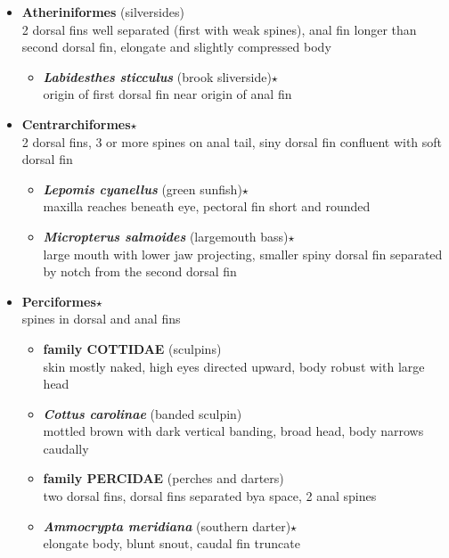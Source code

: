 \documentclass[a4paper,12pt]{article}
\begin{document}
\begin{description}
\begin{itemize}
\begin{itemize}
  \end{itemize}
  \item{\textbf{Atheriniformes} (silversides)} \\ 2 dorsal fins well separated (first with weak spines), anal fin longer than second dorsal fin, elongate and slightly compressed body
  \begin{itemize}
    \item{\textbf{\textit{   Labidesthes sticculus}} (brook sliverside)$\star$} \\ origin of first dorsal fin near origin of anal fin
  \end{itemize}
  \item{\textbf{Centrarchiformes}$\star$} \\ 2 dorsal fins, 3 or more spines on anal tail, siny dorsal fin confluent with soft dorsal fin
  \begin{itemize}
    \item{\textbf{\textit{   Lepomis cyanellus}} (green sunfish)$\star$} \\ maxilla reaches beneath eye, pectoral fin short and rounded
    \item{\textbf{\textit{   Micropterus salmoides}} (largemouth bass)$\star$} \\ large mouth with lower jaw projecting, smaller spiny dorsal fin separated by notch from the second dorsal fin
  \end{itemize}
  \item{\textbf{Perciformes}$\star$} \\ spines in dorsal and anal fins
  \begin{itemize}
    \item{\textbf{family COTTIDAE} (sculpins)} \\ skin mostly naked, high eyes directed upward, body robust with large head
    \item{\textbf{\textit{   Cottus carolinae}} (banded sculpin)} \\ mottled brown with dark vertical banding, broad head, body narrows caudally
    \item{\textbf{family PERCIDAE} (perches and darters)} \\ two dorsal fins, dorsal fins separated bya  space, 2 anal spines
    \item{\textbf{\textit{   Ammocrypta meridiana}} (southern darter)$\star$} \\ elongate body, blunt snout, caudal fin truncate
  \end{itemize}
\end{itemize}


\end{description}
\end{document}
